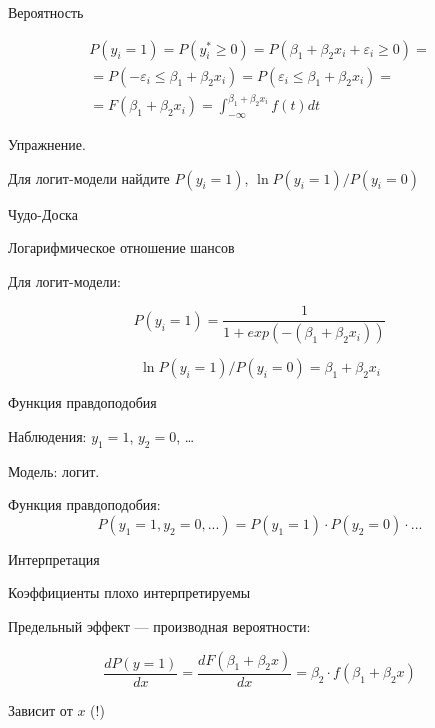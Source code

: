 \documentclass[ignorenonframetext,]{beamer}
\begin{document}
\begin{frame}{Вероятность}

\begin{multline}
P(y_i=1)=P(y^*_i\geq 0)=P(\beta_1 +\beta_2 x_i +\varepsilon_i \geq 0)=\\
=P( -\varepsilon_i \leq \beta_1 +\beta_2 x_i  ) = 
P( \varepsilon_i \leq \beta_1 +\beta_2 x_i  ) = \\
=F(\beta_1 +\beta_2 x_i) = \int_{-\infty}^{\beta_1+\beta_2 x_i} f(t) dt
\end{multline}

\end{frame}

\begin{frame}{Упражнение.}

Для логит-модели найдите $P(y_i=1)$, $\ln P(y_i=1)/P(y_i=0)$

\end{frame}

\begin{frame}{Чудо-Доска}

\end{frame}

\begin{frame}{Логарифмическое отношение шансов}

Для логит-модели:

\[
P(y_i=1)=\frac{1}{1+exp(-(\beta_1+\beta_2 x_i))}
\]

\[
\ln P(y_i=1)/P(y_i=0)=\beta_1 +\beta_2 x_i
\]

\end{frame}

\begin{frame}{Функция правдоподобия}

Наблюдения: $y_1=1$, $y_2=0$, \ldots{}

Модель: логит.

Функция правдоподобия: \[ 
P(y_1=1, y_2=0, ...)=P(y_1=1)\cdot P(y_2=0)\cdot ...
\]

\end{frame}

\begin{frame}{Интерпретация}

Коэффициенты плохо интерпретируемы

Предельный эффект --- производная вероятности:

\[
\frac{dP(y=1)}{dx}=\frac{dF(\beta_1+\beta_2 x)}{dx}=\beta_2 \cdot f(\beta_1+\beta_2x)
\]

Зависит от $x$ (!)

\end{frame}
\end{document}
